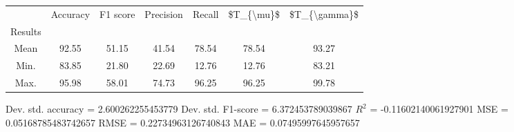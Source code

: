 \begin{tabular}{|c|c|c|c|c|c|c|}
\toprule
{} &  Accuracy &  F1 score &  Precision &  Recall &  \$T\_\{\textbackslash mu\}\$ &  \$T\_\{\textbackslash gamma\}\$ \\
Results &           &           &            &         &            &               \\
\hline
Mean    &     92.55 &     51.15 &      41.54 &   78.54 &      78.54 &         93.27 \\
Min.    &     83.85 &     21.80 &      22.69 &   12.76 &      12.76 &         83.21 \\
Max.    &     95.98 &     58.01 &      74.73 &   96.25 &      96.25 &         99.78 \\
\bottomrule
\end{tabular}

 Dev. std. accuracy = 2.600262255453779
 Dev. std. F1-score = 6.372453789039867
 $R^2$ = -0.11602140061927901
 MSE = 0.05168785483742657
 RMSE = 0.22734963126740843
 MAE = 0.07495997645957657